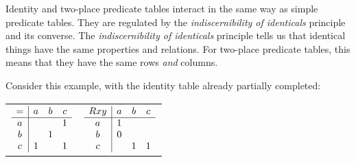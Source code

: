 \documentclass[PHIL101-Textbook.tex]{subfiles}
\begin{document}
Identity and two-place predicate tables interact in the same way as simple predicate tables. They are regulated by the \emph{indiscernibility of identicals} principle and its converse. The \emph{indiscernibility of identicals} principle tells us that identical things have the same properties and relations. For two-place predicate tables, this means that they have the same rows \emph{and} columns. 

\noindent Consider this example, with the identity table already partially completed:

\begin{center}
  \begin{tabular}{ll}
	$\begin{array}{c|ccc}
	   = & a & b & c\\ \hline
	   a &   &   &1\\
	   b &   &1&\\
	   c &1&   &1
	 \end{array}$
		 & 
	$\begin{array}{c|ccc}
	  \mathord{R}{xy} & a & b & c\\ \hline
	   a & 1& & \\
	   b & 0& \\
	   c & & 1& 1
	 \end{array}$
  \end{tabular}
\end{center}
\end{document}
